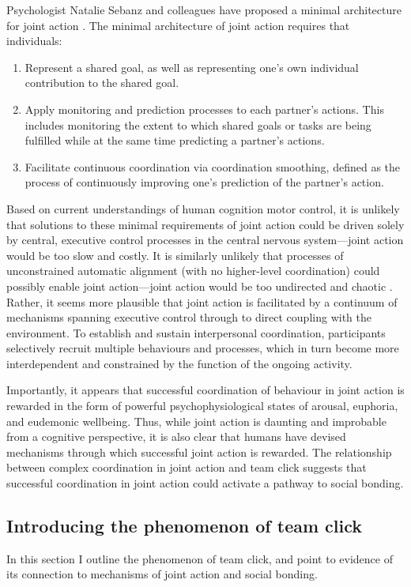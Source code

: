 \begin{CJK}{UTF8}{gbsn}
Psychologist Natalie Sebanz and colleagues have proposed a minimal architecture for joint action \citep{Sebanz2006,Vesper2010}. The minimal architecture of joint action requires that individuals:

\begin{enumerate}
  \item Represent a shared goal, as well as representing one’s own individual contribution to the shared goal.
  \item Apply monitoring and prediction processes to each partner’s actions. This includes monitoring the extent to which shared goals or tasks are being fulfilled while at the same time predicting a partner’s actions.
  \item Facilitate continuous coordination via coordination smoothing, defined as the process of continuously improving one’s prediction of the partner’s action.
\end{enumerate}

Based on current understandings of human cognition motor control, it is unlikely that solutions to these minimal requirements of joint action could be driven solely by central, executive control processes in the central nervous system---joint action would be too slow and costly.  It is similarly unlikely that processes of unconstrained automatic alignment (with no higher-level coordination) could possibly enable joint action---joint action would be too undirected and chaotic \citep{Fusaroli2014}.  Rather, it seems more plausible that joint action is facilitated by a continuum of mechanisms spanning executive control through to direct coupling with the environment.  To establish and sustain interpersonal coordination, participants selectively recruit multiple behaviours and processes, which in turn become more interdependent and constrained by the function of the ongoing activity.

Importantly, it appears that successful coordination of behaviour in joint action is rewarded in the form of powerful psychophysiological states of arousal, euphoria, and eudemonic wellbeing.  Thus, while joint action is daunting and improbable from a cognitive perspective, it is also clear that humans have devised mechanisms through which successful joint action is rewarded. The relationship between complex coordination in joint action and team click suggests that successful coordination in joint action could activate a pathway to social bonding.

\subsection{Introducing the phenomenon of team click\label{sect:teamClickIntro}}
In this section I outline the phenomenon of team click, and point to evidence of its connection to mechanisms of joint action and social bonding.


\end{CJK}
